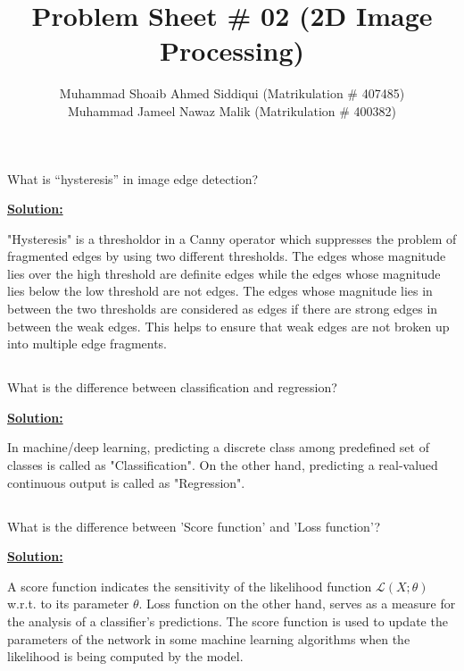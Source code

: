 \documentclass[a4paper,10pt]{article}
\title{Problem Sheet \# 02 (2D Image Processing)}
\author[1]{Muhammad Shoaib Ahmed Siddiqui (Matrikulation \# 407485) \\ Muhammad Jameel Nawaz Malik (Matrikulation \# 400382)}
\begin{document}
\maketitle

\section{}

\subsection{}
What is “hysteresis” in image edge detection?

\textbf{\underline{Solution:}} 

"Hysteresis" is a thresholdor in a Canny operator which suppresses the problem of fragmented edges by using two different thresholds.
The edges whose magnitude lies over the high threshold are definite edges while the edges whose magnitude lies below the low threshold are not edges. The edges whose magnitude lies in between the two thresholds are considered as edges if there are strong edges in between the weak edges.
This helps to ensure that weak edges are not broken up into multiple edge fragments.

\subsection{}
What is the difference between classification and regression?

\textbf{\underline{Solution:}} 

In machine/deep learning, predicting a discrete class among predefined set of classes is called as "Classification". On the other hand, predicting a real-valued continuous output is called as "Regression".

\subsection{}
What is the difference between 'Score function' and 'Loss function'?

\textbf{\underline{Solution:}} 

A score function indicates the sensitivity of the likelihood function $\mathcal{L}(X; \theta)$ w.r.t. to its parameter $\theta$. Loss function on the other hand, serves as a measure for the analysis of a classifier's predictions.
The score function is used to update the parameters of the network in some machine learning algorithms when the likelihood is being computed by the model.
\end{document}
